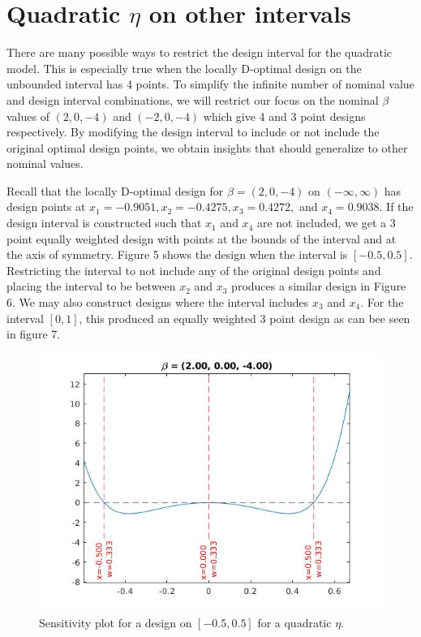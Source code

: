 \documentclass[11pt,a4paper]{article}
\begin{document}
\section{Quadratic $\eta$ on other intervals}
There are many possible ways to restrict the design interval for the quadratic model. This is especially true when the locally D-optimal design on the unbounded interval has 4 points. To simplify the infinite number of nominal value and design interval combinations, we will restrict our focus on the nominal $\beta$ values of $(2, 0, -4)$ and $(-2, 0, -4)$ which give 4 and 3 point designs respectively. By modifying the design interval to include or not include the original optimal design points, we obtain insights that should generalize to other nominal values.

Recall that the locally D-optimal design for $\beta = (2,0,-4)$ on $(-\infty, \infty)$ has design points at $x_1=-0.9051, x_2=-0.4275, x_3=0.4272,$ and  $x_4=0.9038$. If the design interval is constructed such that $x_1$ and $x_4$ are not included, we get a 3 point equally weighted design with points at the bounds of the interval and at the axis of symmetry. Figure 5 shows the design when the interval is $[-0.5, 0.5]$. Restricting the interval to not include any of the original design points and placing the interval to be between $x_2$ and $x_3$ produces a similar design in Figure 6. We may also construct designs where the interval includes $x_3$ and $x_4$.  For the interval $[0,1]$, this produced an equally weighted 3 point design as can bee seen in figure 7.



\begin{figure}
\centering
\includegraphics[scale=0.5]{figures/4pt_include2mid.jpg}
\caption{Sensitivity plot for a design on $[-0.5, 0.5]$ for a quadratic $\eta$.}
\end{figure}
\end{document}
